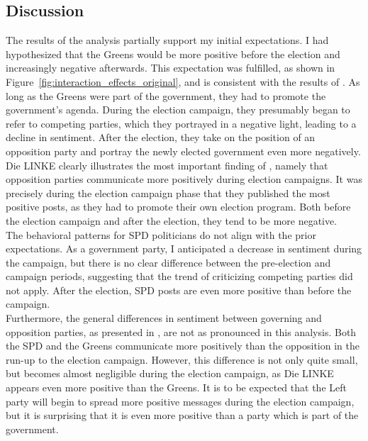 \documentclass{article}
\begin{document}
\subsection{Discussion}
The results of the analysis partially support my initial expectations. I had hypothesized that the Greens would be more positive before the election and increasingly negative afterwards. This expectation was fulfilled, as shown in Figure~\ref{fig:interaction_effects_original}, and is consistent with the results of \textcite{castanho_silva_modulation_2024}. As long as the Greens were part of the government, they had to promote the government's agenda. During the election campaign, they presumably began to refer to competing parties, which they portrayed in a negative light, leading to a decline in sentiment. After the election, they take on the position of an opposition party and portray the newly elected government even more negatively. \\
\noindent Die LINKE clearly illustrates the most important finding of \textcite{castanho_silva_modulation_2024}, namely that opposition parties communicate more positively during election campaigns. It was precisely during the election campaign phase that they published the most positive posts, as they had to promote their own election program. Both before the election campaign and after the election, they tend to be more negative. \\
\noindent The behavioral patterns for SPD politicians do not align with the prior expectations. As a government party, I anticipated a decrease in sentiment during the campaign, but there is no clear difference between the pre-election and campaign periods, suggesting that the trend of criticizing competing parties did not apply. After the election, SPD posts are even more positive than before the campaign. \\ 
\noindent Furthermore, the general differences in sentiment between governing and opposition parties, as presented in \textcite{crabtree_it_2020}, are not as pronounced in this analysis. Both the SPD and the Greens communicate more positively than the opposition in the run-up to the election campaign. However, this difference is not only quite small, but becomes almost negligible during the election campaign, as Die LINKE appears even more positive than the Greens. It is to be expected that the Left party will begin to spread more positive messages during the election campaign, but it is surprising that it is even more positive than a party which is part of the government. \\
\end{document}
